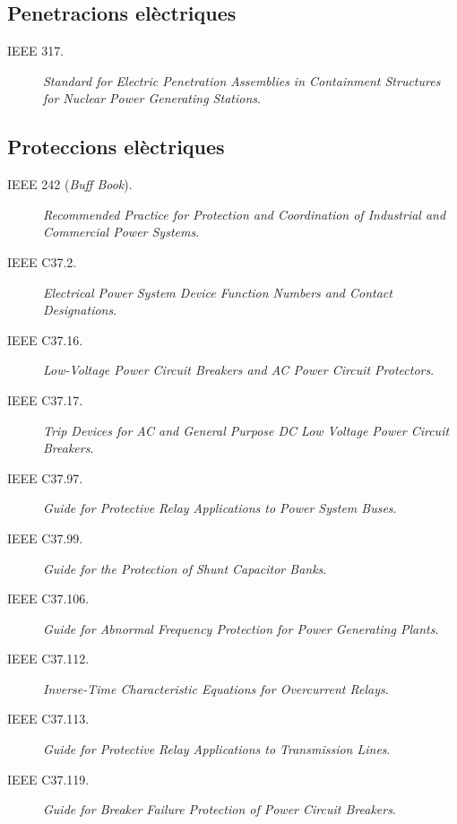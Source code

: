 \subsection*{Penetracions elèctriques}
\begin{description}
	\item [\hspace{5mm}IEEE 317.] \textit{Standard for Electric Penetration Assemblies in Containment Structures for Nuclear Power Generating Stations}.
\end{description}


\subsection*{Proteccions elèctriques}
\begin{description}
	\item [\hspace{5mm}IEEE 242 (\textit{Buff Book}).] \textit{Recommended Practice for Protection and Coordination of Industrial and Commercial Power Systems}.
	\item [\hspace{5mm}IEEE C37.2.] \textit{Electrical Power System Device Function Numbers and Contact Designations}.
	\item [\hspace{5mm}IEEE C37.16.] \textit{Low-Voltage Power Circuit Breakers and AC Power Circuit Protectors}.
	\item [\hspace{5mm}IEEE C37.17.] \textit{Trip Devices for AC and General Purpose DC Low Voltage Power Circuit Breakers}.
	\item [\hspace{5mm}IEEE C37.97.] \textit{Guide for Protective Relay Applications to Power System Buses}.
	\item [\hspace{5mm}IEEE C37.99.] \textit{Guide for the Protection of Shunt Capacitor Banks}.
	\item [\hspace{5mm}IEEE C37.106.] \textit{Guide for Abnormal Frequency Protection for Power Generating Plants}.
	\item [\hspace{5mm}IEEE C37.112.] \textit{Inverse-Time Characteristic Equations for Overcurrent Relays}.
	\item [\hspace{5mm}IEEE C37.113.] \textit{Guide for Protective Relay Applications to Transmission Lines}.
	\item [\hspace{5mm}IEEE C37.119.] \textit{Guide for Breaker Failure Protection of Power Circuit Breakers}.
\end{description}

